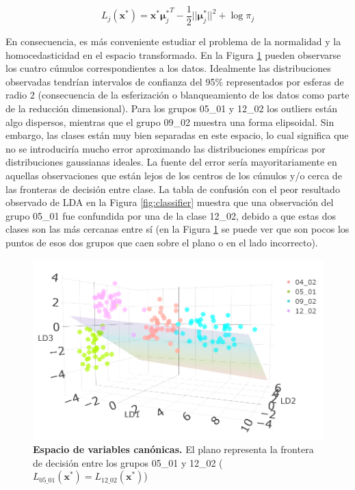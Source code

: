 \documentclass[12pt]{article}
\begin{document}
\begin{equation} \label{eq:lineal_discriminant_proy}
L_j (\mathbf{x}^{*}) = \mathbf{x}^{*} {\boldsymbol{\mu}^{*}_j}^T - \frac{1}{2} ||\boldsymbol{\mu}^{*}_j||^2 + \log \pi_j
\end{equation}

En consecuencia, es más conveniente estudiar el problema de la normalidad y la homocedasticidad en el espacio transformado. En la Figura \ref{fig:LDAspace} pueden observarse los cuatro cúmulos correspondientes a los datos. Idealmente las distribuciones observadas tendrían intervalos de confianza del 95\% representados por esferas de radio 2 (consecuencia de la esferización o blanqueamiento de los datos como parte de la reducción dimensional). Para los grupos 05\_01 y 12\_02 los outliers están algo dispersos, mientras que el grupo 09\_02 muestra una forma elipsoidal. Sin embargo, las clases están muy bien separadas en este espacio, lo cual significa que no se introduciría mucho error aproximando las distribuciones empíricas por distribuciones gaussianas ideales. La fuente del error sería mayoritariamente en aquellas observaciones que están lejos de los centros de los cúmulos y/o cerca de las fronteras de decisión entre clase. La tabla de confusión con el peor resultado observado de LDA en la Figura \ref{fig:classifier} muestra que una observación del grupo 05\_01 fue confundida por una de la clase 12\_02, debido a que estas dos clases son las más cercanas entre sí (en la Figura \ref{fig:LDAspace} se puede ver que son pocos los puntos de esos dos grupos que caen sobre el plano o en el lado incorrecto).

\begin{figure}[htbp]
    \centering
    \includegraphics[width=14cm]{LDAspace2.png}
    \caption{\textbf{Espacio de variables canónicas.} El plano representa la frontera de decisión entre los grupos 05\_01 y 12\_02 ($L_{05\_01}(\mathbf{x}^*) = L_{12\_02}(\mathbf{x}^*)$)}
    \label{fig:LDAspace}
\end{figure}
\end{document}
